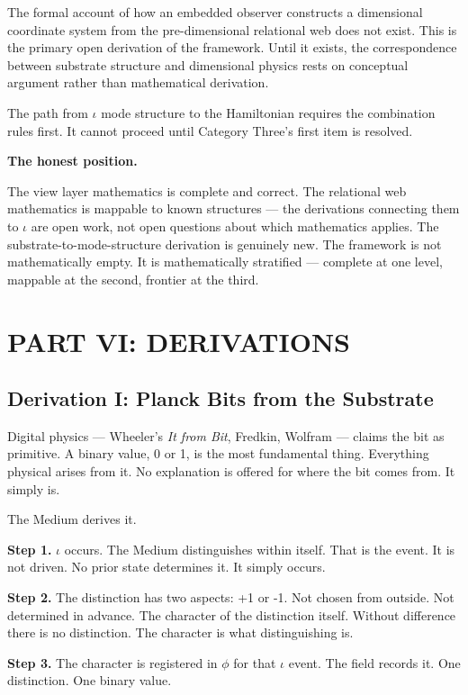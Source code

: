 \documentclass[11pt,letterpaper]{article}
\begin{document}
The formal account of how an embedded observer constructs a dimensional coordinate system from the pre-dimensional relational web does not exist. This is the primary open derivation of the framework. Until it exists, the correspondence between substrate structure and dimensional physics rests on conceptual argument rather than mathematical derivation.

The path from \(\iota\) mode structure to the Hamiltonian requires the combination rules first. It cannot proceed until Category Three's first item is resolved.

\textbf{The honest position.}

The view layer mathematics is complete and correct. The relational web mathematics is mappable to known structures --- the derivations connecting them to \(\iota\) are open work, not open questions about which mathematics applies. The substrate-to-mode-structure derivation is genuinely new. The framework is not mathematically empty. It is mathematically stratified --- complete at one level, mappable at the second, frontier at the third.

\section{PART VI: DERIVATIONS}
\label{sec:org4ede949}


\subsection{Derivation I: Planck Bits from the Substrate}
\label{sec:org4b701c7}

Digital physics --- Wheeler's \emph{It from Bit}, Fredkin, Wolfram --- claims the bit as primitive. A binary value, 0 or 1, is the most fundamental thing. Everything physical arises from it. No explanation is offered for where the bit comes from. It simply is.

The Medium derives it.

\textbf{Step 1.} \(\iota\) occurs. The Medium distinguishes within itself. That is the event. It is not driven. No prior state determines it. It simply occurs.

\textbf{Step 2.} The distinction has two aspects: +1 or -1. Not chosen from outside. Not determined in advance. The character of the distinction itself. Without difference there is no distinction. The character is what distinguishing is.

\textbf{Step 3.} The character is registered in \(\phi\) for that \(\iota\) event. The field records it. One distinction. One binary value.
\end{document}
